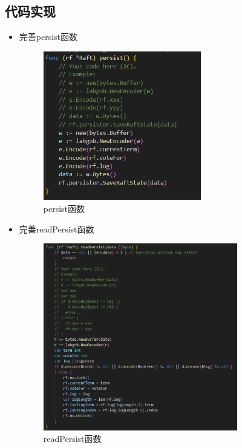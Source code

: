 \documentclass[]{article}
\begin{document}
	\subsection{代码实现}
	\begin{itemize}
		\item 完善persist函数
		\begin{figure}[H]
			\centering
			\includegraphics[width=0.65\textwidth]{./2C/persist.png}
			\caption{persist函数}
		\end{figure}
		\item 完善readPersist函数
		\begin{figure}[H]
			\centering
			\includegraphics[width=0.8\textwidth]{./2C/readPersist.png}
			\caption{readPersist函数}
		\end{figure}
	\end{itemize}
\end{document}
